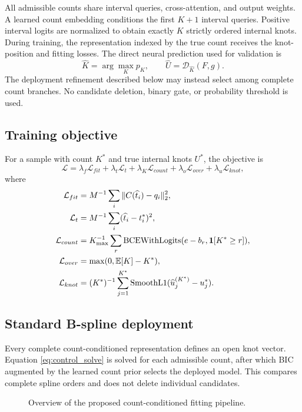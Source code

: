 All admissible counts share interval queries, cross-attention, and output
weights. A learned count embedding conditions the first $K+1$ interval queries.
Positive interval logits are normalized to obtain exactly $K$ strictly ordered
internal knots. During training, the representation indexed by the true count
receives the knot-position and fitting losses.
The direct neural prediction used for validation is
\begin{equation}
  \widehat K=\arg\max_K p_K,
  \qquad \widehat U=\mathcal D_{\widehat K}(F,g).
\end{equation}
The deployment refinement described below may instead select among complete
count branches. No candidate deletion, binary gate, or probability threshold
is used.

\subsection{Training objective}

For a sample with count $K^*$ and true internal knots $U^*$, the objective is
\begin{equation}
  \mathcal L=\lambda_f\mathcal L_{fit}
  +\lambda_t\mathcal L_t
  +\lambda_K\mathcal L_{count}
  +\lambda_o\mathcal L_{over}
  +\lambda_u\mathcal L_{knot},
\end{equation}
where
\begin{align}
  \mathcal L_{fit}&=M^{-1}\sum_i\|C(\widehat t_i)-q_i\|_2^2,\\
  \mathcal L_t&=M^{-1}\sum_i(\widehat t_i-t_i^*)^2,\\
  \mathcal L_{count}&=K_{\max}^{-1}\sum_r
  \operatorname{BCEWithLogits}(e-b_r,\mathbf 1[K^*\ge r]),\\
  \mathcal L_{over}&=\max(0,\mathbb E[K]-K^*),\\
  \mathcal L_{knot}&=(K^*)^{-1}\sum_{j=1}^{K^*}
  \operatorname{SmoothL1}(\widehat u_j^{(K^*)}-u_j^*).
\end{align}

\subsection{Standard B-spline deployment}

Every complete count-conditioned representation defines an open knot vector.
Equation \eqref{eq:control_solve} is solved for each admissible count, after
which BIC augmented by the learned count prior selects the deployed model.
This compares complete spline orders and does not delete individual candidates.

\begin{figure}[t]
  \centering
  \caption{Overview of the proposed count-conditioned fitting pipeline.}
  \label{fig:architecture}
\end{figure}

